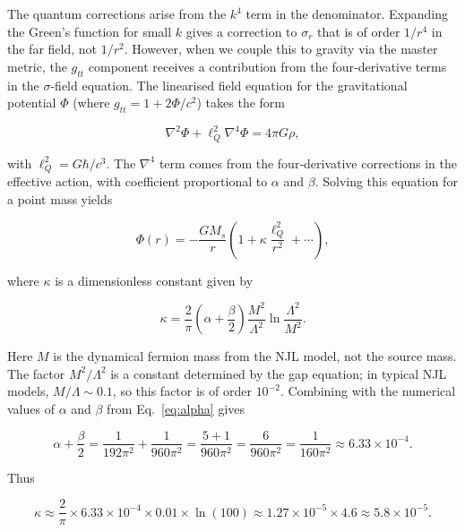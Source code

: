 \documentclass[11pt,a4paper]{article}
\begin{document}
The quantum corrections arise from the \(k^4\) term in the denominator. Expanding the Green's function for small \(k\) gives a correction to \(\sigma_r\) that is of order \(1/r^4\) in the far field, not \(1/r^2\). However, when we couple this to gravity via the master metric, the \(g_{tt}\) component receives a contribution from the four‑derivative terms in the \(\sigma\)-field equation. The linearised field equation for the gravitational potential \(\Phi\) (where \(g_{tt} = 1 + 2\Phi/c^2\)) takes the form

\begin{equation}
\nabla^2 \Phi + \ell_Q^2 \nabla^4 \Phi = 4\pi G \rho,
\end{equation}

with \(\ell_Q^2 = G\hbar/c^3\). The \(\nabla^4\) term comes from the four‑derivative corrections in the effective action, with coefficient proportional to \(\alpha\) and \(\beta\). Solving this equation for a point mass yields

\begin{equation}
\Phi(r) = -\frac{GM_s}{r} \left(1 + \kappa \frac{\ell_Q^2}{r^2} + \cdots \right),
\end{equation}

where \(\kappa\) is a dimensionless constant given by

\begin{equation}
\kappa = \frac{2}{\pi} \left( \alpha + \frac{\beta}{2} \right) \frac{M^2}{\Lambda^2} \ln\frac{\Lambda^2}{M^2}. \label{eq:kappa}
\end{equation}

Here \(M\) is the dynamical fermion mass from the NJL model, not the source mass. The factor \(M^2/\Lambda^2\) is a constant determined by the gap equation; in typical NJL models, \(M/\Lambda \sim 0.1\), so this factor is of order \(10^{-2}\). Combining with the numerical values of \(\alpha\) and \(\beta\) from Eq.~\eqref{eq:alpha} gives

\begin{equation}
\alpha + \frac{\beta}{2} = \frac{1}{192\pi^2} + \frac{1}{960\pi^2} = \frac{5 + 1}{960\pi^2} = \frac{6}{960\pi^2} = \frac{1}{160\pi^2} \approx 6.33 \times 10^{-4}.
\end{equation}

Thus

\begin{equation}
\kappa \approx \frac{2}{\pi} \times 6.33 \times 10^{-4} \times 0.01 \times \ln(100) \approx 1.27 \times 10^{-5} \times 4.6 \approx 5.8 \times 10^{-5}.
\end{equation}
\end{document}
